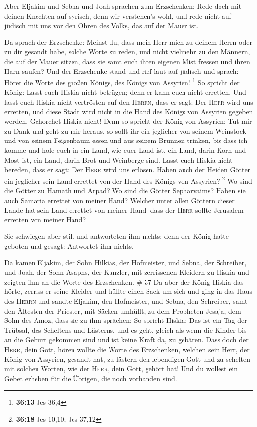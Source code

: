  Aber Eljakim und Sebna und Joah sprachen zum
Erzschenken: Rede doch mit deinen Knechten auf syrisch, denn wir
verstehen's wohl, und rede nicht auf jüdisch mit uns vor den Ohren des
Volks, das auf der Mauer ist.

 Da sprach der Erzschenke: Meinst du, dass mein Herr mich
zu deinem Herrn oder zu dir gesandt habe, solche Worte zu reden, und
nicht vielmehr zu den Männern, die auf der Mauer sitzen, dass sie samt
euch ihren eigenen Mist fressen und ihren Harn saufen? 
Und der Erzschenke stand und rief laut auf jüdisch und sprach: Höret die
Worte des großen Königs, des Königs von Assyrien! \footnote{\textbf{36:13}
  Jes 36,4}  So spricht der König: Lasst euch Hiskia
nicht betrügen; denn er kann euch nicht erretten.  Und
lasst euch Hiskia nicht vertrösten auf den \textsc{Herrn}, dass er sagt:
Der \textsc{Herr} wird uns erretten, und diese Stadt wird nicht in die
Hand des Königs von Assyrien gegeben werden.  Gehorchet
Hiskia nicht! Denn so spricht der König von Assyrien: Tut mir zu Dank
und geht zu mir heraus, so sollt ihr ein jeglicher von seinem Weinstock
und von seinem Feigenbaum essen und aus seinem Brunnen trinken,
 bis dass ich komme und hole euch in ein Land, wie euer
Land ist, ein Land, darin Korn und Most ist, ein Land, darin Brot und
Weinberge sind.  Lasst euch Hiskia nicht bereden, dass er
sagt: Der \textsc{Herr} wird uns erlösen. Haben auch der Heiden Götter
ein jeglicher sein Land errettet von der Hand des Königs von Assyrien?
\footnote{\textbf{36:18} Jes 10,10; Jes 37,12}  Wo sind
die Götter zu Hamath und Arpad? Wo sind die Götter Sepharvaims? Haben
sie auch Samaria errettet von meiner Hand?  Welcher unter
allen Göttern dieser Lande hat sein Land errettet von meiner Hand, dass
der \textsc{Herr} sollte Jerusalem erretten von meiner Hand?

 Sie schwiegen aber still und antworteten ihm nichts;
denn der König hatte geboten und gesagt: Antwortet ihm nichts.

 Da kamen Eljakim, der Sohn Hilkias, der Hofmeister, und
Sebna, der Schreiber, und Joah, der Sohn Asaphs, der Kanzler, mit
zerrissenen Kleidern zu Hiskia und zeigten ihm an die Worte des
Erzschenken. \# 37  Da aber der König Hiskia das hörte,
zerriss er seine Kleider und hüllte einen Sack um sich und ging in das
Haus des \textsc{Herrn}  und sandte Eljakim, den
Hofmeister, und Sebna, den Schreiber, samt den Ältesten der Priester,
mit Säcken umhüllt, zu dem Propheten Jesaja, dem Sohn des Amoz,
 dass sie zu ihm sprächen: So spricht Hiskia: Das ist ein
Tag der Trübsal, des Scheltens und Lästerns, und es geht, gleich als
wenn die Kinder bis an die Geburt gekommen sind und ist keine Kraft da,
zu gebären.  Dass doch der \textsc{Herr}, dein Gott, hören
wollte die Worte des Erzschenken, welchen sein Herr, der König von
Assyrien, gesandt hat, zu lästern den lebendigen Gott und zu schelten
mit solchen Worten, wie der \textsc{Herr}, dein Gott, gehört hat! Und du
wollest ein Gebet erheben für die Übrigen, die noch vorhanden sind.

